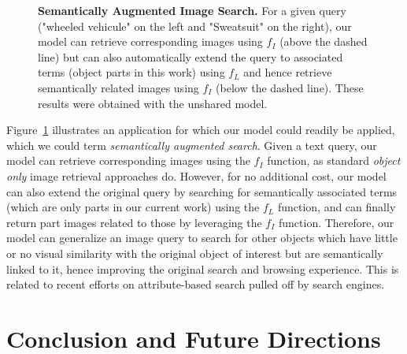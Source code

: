\begin{figure}
  \begin{center}
    \caption{\label{fig:sem_search}{\bf Semantically Augmented Image Search.} {\small For a given query 
    ("wheeled vehicule" on the left and "Sweatsuit" on the right), our model can retrieve corresponding images
    using $f_{I}$ (above the dashed line) but can also automatically extend the query to associated terms 
    (object parts in this work) using $f_{L}$ and hence retrieve semantically related images using $f_{I}$ 
    (below the dashed line). These results were obtained with the unshared model.}}
    \end{center}
\end{figure}


Figure~\ref{fig:sem_search} illustrates an application for which our model could readily be applied, which 
we could term {\it semantically augmented search}. Given a text query, our model can retrieve corresponding 
images using the $f_I$ function, as standard {\it object only} image retrieval approaches do.
However, for no additional cost, 
our model can also extend the original query by searching for semantically associated terms (which are only parts in our current work) 
using the $f_L$ function, and can finally return part images related to those by leveraging the $f_I$ function.
%
Therefore, our model can generalize an image query to search for other objects which have little 
or no visual similarity with the original object of interest but are semantically linked to it, hence improving the original search and browsing experience.
%
This is related to recent efforts on attribute-based search pulled off by search engines.

\section{Conclusion and Future Directions} \label{conclusion}

